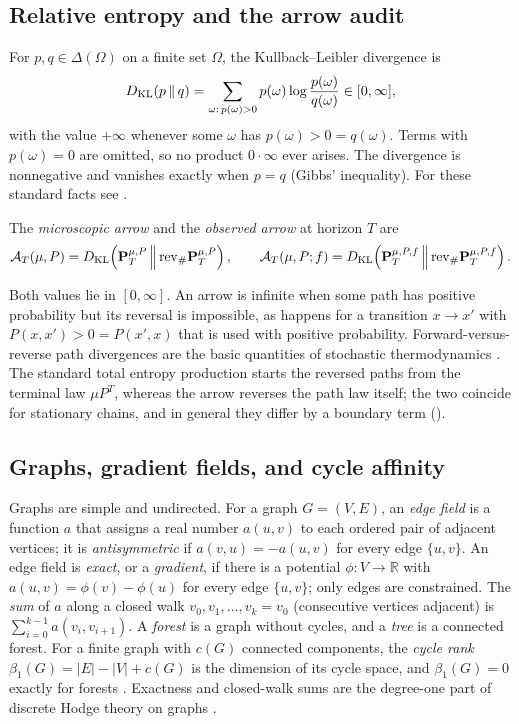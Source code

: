 \subsection{Relative entropy and the arrow audit}
For $p,q\in\Delta(\Omega)$ on a finite set $\Omega$, the Kullback--Leibler divergence is
\[
  D_{\mathrm{KL}}\!\left(p\,\middle\|\,q\right)=\sum_{\omega:\,p(\omega)>0}p(\omega)\log\frac{p(\omega)}{q(\omega)}\in[0,\infty],
\]
with the value $+\infty$ whenever some $\omega$ has $p(\omega)>0=q(\omega)$.
Terms with $p(\omega)=0$ are omitted, so no product $0\cdot\infty$ ever arises.
The divergence is nonnegative and vanishes exactly when $p=q$ (Gibbs' inequality).
For these standard facts see \citep{KullbackLeibler1951,CoverThomas2006}.

\begin{definition}\label{def:arrow}
The \emph{microscopic arrow} and the \emph{observed arrow} at horizon $T$ are
\[
  \mathcal{A}_T(\mu,P)=D_{\mathrm{KL}}\!\left(\mathbf{P}^{\mu,P}_T\,\middle\|\,\mathrm{rev}_{\#}\mathbf{P}^{\mu,P}_T\right),
  \qquad
  \mathcal{A}_T(\mu,P;f)=D_{\mathrm{KL}}\!\left(\mathbf{P}^{\mu,P,f}_T\,\middle\|\,\mathrm{rev}_{\#}\mathbf{P}^{\mu,P,f}_T\right).
\]
\end{definition}

Both values lie in $[0,\infty]$.
An arrow is infinite when some path has positive probability but its reversal is impossible, as happens for a transition $x\to x'$ with $P(x,x')>0=P(x',x)$ that is used with positive probability.
Forward-versus-reverse path divergences are the basic quantities of stochastic thermodynamics \citep{Seifert2012,MaesNetocny2003}.
The standard total entropy production starts the reversed paths from the terminal law $\mu P^T$, whereas the arrow reverses the path law itself; the two coincide for stationary chains, and in general they differ by a boundary term ().

\subsection{Graphs, gradient fields, and cycle affinity}
Graphs are simple and undirected.
For a graph $G=(V,E)$, an \emph{edge field} is a function $a$ that assigns a real number $a(u,v)$ to each ordered pair of adjacent vertices; it is \emph{antisymmetric} if $a(v,u)=-a(u,v)$ for every edge $\{u,v\}$.
An edge field is \emph{exact}, or a \emph{gradient}, if there is a potential $\phi:V\to\mathbb{R}$ with $a(u,v)=\phi(v)-\phi(u)$ for every edge $\{u,v\}$; only edges are constrained.
The \emph{sum} of $a$ along a closed walk $v_0,v_1,\dots,v_k=v_0$ (consecutive vertices adjacent) is $\sum_{i=0}^{k-1}a(v_i,v_{i+1})$.
A \emph{forest} is a graph without cycles, and a \emph{tree} is a connected forest.
For a finite graph with $c(G)$ connected components, the \emph{cycle rank} $\beta_1(G)=|E|-|V|+c(G)$ is the dimension of its cycle space, and $\beta_1(G)=0$ exactly for forests \citep{Diestel2017,Biggs1993}.
Exactness and closed-walk sums are the degree-one part of discrete Hodge theory on graphs \citep{Lim2020Hodge}.

